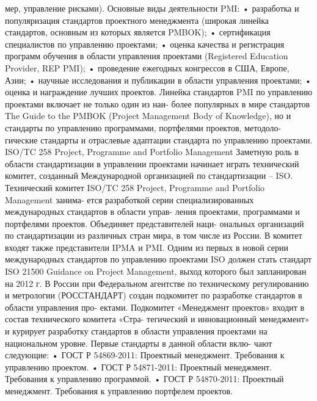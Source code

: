 мер, управление рисками).
Основные виды деятельности PMI:
• разработка и популяризация стандартов проектного менеджмента (широкая линейка
стандартов, основным из которых является PMBOK);
• сертификация специалистов по управлению проектами;
• оценка качества и регистрация программ обучения в области управления проектами
(Registered Education Provider, REP PMI);
• проведение ежегодных конгрессов в США, Европе, Азии;
• научные исследования и публикации в области управления проектами;
• оценка и награждение лучших проектов.
Линейка стандартов PMI по управлению проектами включает не только один из наи-
более популярных в мире стандартов The Guide to the PMBOK (Project Management Body of
Knowledge), но и стандарты по управлению программами, портфелями проектов, методоло-
гические стандарты и отраслевые адаптации стандарта по управлению проектами.
ISO/TC 258 Project, Programme and Portfolio Management
Заметную роль в области стандартизации в управлении проектами начинает играть
технический комитет, созданный Международной организацией по стандартизации – ISO.
Технический комитет ISO/TC 258 Project, Programme and Portfolio Management занима-
ется разработкой серии специализированных международных стандартов в области управ-
ления проектами, программами и портфелями проектов. Объединяет представителей наци-
ональных организаций по стандартизации из различных стран мира, в том числе из России.
В комитет входят также представители IPMA и PMI.
Одним из первых в новой серии международных стандартов по управлению проектами
ISO должен стать стандарт ISO 21500 Guidance on Project Management, выход которого был
запланирован на 2012 г.
В России при Федеральном агентстве по техническому регулированию и метрологии
(РОССТАНДАРТ) создан подкомитет по разработке стандартов в области управления про-
ектами. Подкомитет «Менеджмент проектов» входит в состав технического комитета «Стра-
тегический и инновационный менеджмент» и курирует разработку стандартов в области
управления проектами на национальном уровне. Первые стандарты в данной области вклю-
чают следующие:
• ГОСТ Р 54869-2011: Проектный менеджмент. Требования к управлению проектом.
• ГОСТ Р 54871-2011: Проектный менеджмент. Требования к управлению программой.
• ГОСТ Р 54870-2011: Проектный менеджмент. Требования к управлению портфелем
проектов.


